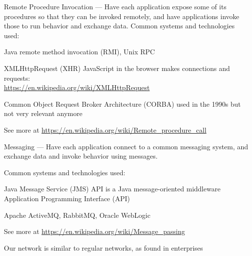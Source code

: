\documentclass[Screen16to9,17pt]{foils}
\begin{document}


Remote Procedure Invocation — Have each application expose some of its procedures so that they can be invoked remotely, and have applications invoke those to run behavior and exchange data.
Common systems and technologies used:
\begin{list2}
\item Java remote method invocation (RMI), Unix RPC
\item XMLHttpRequest (XHR) JavaScript in the browser makes connections and requests:\\ \url{https://en.wikipedia.org/wiki/XMLHttpRequest}
\item Common Object Request Broker Architecture (CORBA) used in the 1990s but not very relevant anymore
\item See more at \url{https://en.wikipedia.org/wiki/Remote_procedure_call}
\end{list2}



Messaging — Have each application connect to a common messaging system, and exchange data and invoke behavior using messages.

Common systems and technologies used:
\begin{list2}
\item Java Message Service (JMS) API is a Java message-oriented middleware Application Programming Interface (API)
\item Apache ActiveMQ, RabbitMQ, Oracle WebLogic
\item See more at \url{https://en.wikipedia.org/wiki/Message_passing}
\end{list2}







\begin{list1}
\item Our network is similar to regular networks, as found in enterprises
\end{list1}

\end{document}

